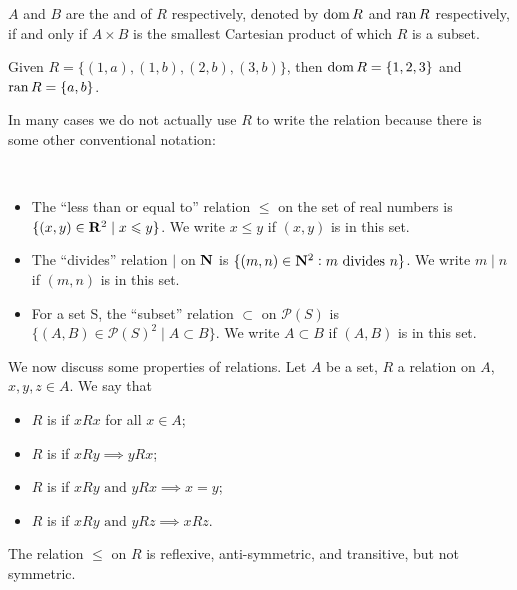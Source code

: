 $A$ and $B$ are the  and  of $R$ respectively, denoted by $\operatorname{dom} R$ and $\operatorname{ran} R$ respectively, if and only if $A \times B$ is the smallest Cartesian product of which $R$ is a subset.

\begin{example}
Given $R=\{(1,a),(1,b),(2,b),(3,b)\}$, then $\operatorname{dom} R=\{1,2,3\}$ and $\operatorname{ran} R=\{a,b\}$.
\end{example}

In many cases we do not actually use $R$ to write the relation because there is some other conventional notation:

\begin{example} \
\begin{itemize}
\item The ``less than or equal to'' relation $\le$ on the set of real numbers is $\{(x,y) \in \mathbf R^2 \mid x \leqslant y\}$. We write $x \le y$ if $(x,y)$ is in this set.
\item The ``divides'' relation $\mid$ on $\mathbf N$ is $\{(m,n) \in \mathbf N^2: m \text{ divides } n\}$. We write $m \mid n$ if $(m,n)$ is in this set.
\item For a set S, the ``subset'' relation $\subset$ on $\mathcal{P}(S)$ is $\{(A,B) \in \mathcal{P}(S)^2 \mid A \subset B\}$. We write $A \subset B$ if $(A,B)$ is in this set.
\end{itemize}
\end{example}

We now discuss some properties of relations. Let $A$ be a set, $R$ a relation on $A$, $x,y,z \in A$. We say that
\begin{itemize}
\item $R$ is  if $xRx$ for all $x\in A$;
\item $R$ is  if $xRy \implies yRx$;
\item $R$ is  if $xRy \text{ and } yRx \implies x=y$;
\item $R$ is \vocab{transitive} if $xRy \text{ and } yRz \implies xRz$.
\end{itemize}

\begin{example}
The relation $\le$ on $R$ is reflexive, anti-symmetric, and transitive, but not symmetric. 
\end{example}

